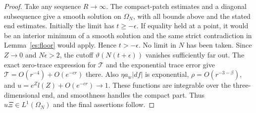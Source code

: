 \begin{proof}
Take any sequence $R\to\infty$.  The compact-patch estimates and a
diagonal subsequence give a smooth solution on $\Omega_N$, with all
bounds above and the stated end estimates.  Initially the limit has
$t\ge-\epsilon$.  If equality held at a point, it would be an interior
minimum of a smooth solution and the same strict contradiction in
Lemma~\ref{es:floor} would apply.  Hence $t>-\epsilon$.
No limit in $N$ has been taken.
Since $Z\to0$ and $N\epsilon>2$, the cutoff
$\vartheta(N(t+\epsilon))$ vanishes sufficiently far out.  The exact
zero-trace expression for $\mathcal T$ and the exponential trace error
give $\mathcal T=O(r^{-4})+O(e^{-cr})$ there.  Also
$\eta a_w|df|$ is exponential, $\rho=O(r^{-3-\beta})$, and
$u=e^Zl(Z)+O(e^{-cr})\to1$.  These functions are integrable over the
three-dimensional end, and smoothness handles the compact part.
Thus $u\Xi\in L^1(\Omega_N)$ and the final assertions follow.
\end{proof}
